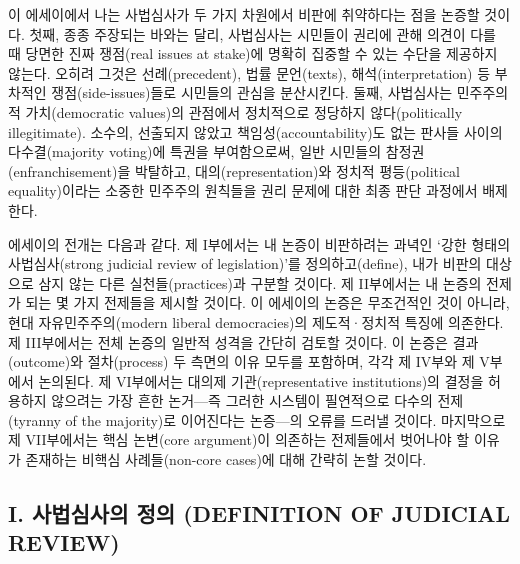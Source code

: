 \documentclass[a4paper,12pt,oneside]{article}  %
\begin{document}
이 에세이에서 나는 사법심사가 두 가지 차원에서 비판에 취약하다는 점을
논증할 것이다. 첫째, 종종 주장되는 바와는 달리, 사법심사는 시민들이
권리에 관해 의견이 다를 때 당면한 진짜 쟁점(real issues at stake)에
명확히 집중할 수 있는 수단을 제공하지 않는다. 오히려 그것은
선례(precedent), 법률 문언(texts), 해석(interpretation) 등 부차적인
쟁점(side-issues)들로 시민들의 관심을 분산시킨다. 둘째, 사법심사는
민주주의적 가치(democratic values)의 관점에서 정치적으로 정당하지
않다(politically illegitimate). 소수의, 선출되지 않았고
책임성(accountability)도 없는 판사들 사이의 다수결(majority voting)에
특권을 부여함으로써, 일반 시민들의 참정권(enfranchisement)을 박탈하고,
대의(representation)와 정치적 평등(political equality)이라는 소중한
민주주의 원칙들을 권리 문제에 대한 최종 판단 과정에서 배제한다.

에세이의 전개는 다음과 같다. 제 I부에서는 내 논증이 비판하려는 과녁인
`강한 형태의 사법심사(strong judicial review of legislation)'를
정의하고(define), 내가 비판의 대상으로 삼지 않는 다른
실천들(practices)과 구분할 것이다. 제 II부에서는 내 논증의 전제가 되는
몇 가지 전제들을 제시할 것이다. 이 에세이의 논증은 무조건적인 것이 아니라,
현대 자유민주주의(modern liberal democracies)의 제도적·정치적 특징에
의존한다. 제 III부에서는 전체 논증의 일반적 성격을 간단히 검토할 것이다.
이 논증은 결과(outcome)와 절차(process) 두 측면의 이유 모두를 포함하며,
각각 제 IV부와 제 V부에서 논의된다. 제 VI부에서는 대의제
기관(representative institutions)의 결정을 허용하지 않으려는 가장 흔한
논거---즉 그러한 시스템이 필연적으로 다수의 전제(tyranny of the
majority)로 이어진다는 논증---의 오류를 드러낼 것이다. 마지막으로 제
VII부에서는 핵심 논변(core argument)이 의존하는 전제들에서 벗어나야 할
이유가 존재하는 비핵심 사례들(non-core cases)에 대해 간략히 논할 것이다.

\subsection{I. 사법심사의 정의 (DEFINITION OF JUDICIAL
REVIEW)}\label{i.-uxc0acuxbc95uxc2ecuxc0acuxc758-uxc815uxc758-definition-of-judicial-review}
\end{document}
